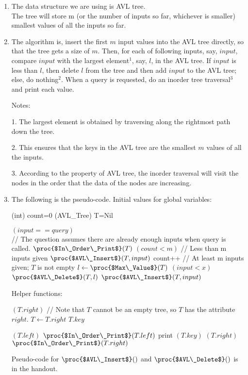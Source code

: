 \documentclass[11pt, answers]{exam}
\theoremstyle{plain}
\theoremstyle{definition}
\begin{document}
\begin{questions}
\question
\begin{solution}
\begin{enumerate}
\item The data structure we are using is AVL tree. \\
The tree will store m (or the number of inputs so far, whichever is smaller) smallest values of all the inputs so far.

\item The algorithm is, insert the first $m$ input values into the AVL tree directly, so that the tree gets a size of $m$. Then, for each of following inputs, say, $input$, compare $input$ with the largest element$^1$, say, $l$, in the AVL tree. If $input$ is less than $l$, then delete $l$ from the tree and then add $input$ to the AVL tree; else, do nothing$^2$. When a query is requested, do an inorder tree traversal$^3$ and print each value.

Notes: 

1. The largest element is obtained by traversing along the rightmost path down the tree.

2. This ensures that the keys in the AVL tree are the smallest $m$ values of all the inputs. 

3.  According to the property of AVL tree, the inorder traversal will visit the nodes in the order that the data of the nodes are increasing.

\item The following is the pseudo-code.
Initial values for global variables:
\begin{codebox}
\li (int) count=0
\li (AVL\_Tree) T=Nil
\end{codebox}

\begin{codebox}
\li \If $(input == query)$ \\// The question assumes there are already enough inputs when query is called.
\li     \Then $\proc{$In\_Order\_Print$}(T)$
\li     \Else
\li     \If $(count < m)$ // Less than m inputs given
\li         \Then $\proc{$AVL\_Insert$}(T, input)$
\li         count++
\li     \Else // At least m inputs given; $T$ is not empty
\li         $l \gets \proc{$Max\_Value$}(T)$
\li         \If $(input<x)$
\li             \Then $\proc{$AVL\_Delete$}(T, l)$
\li             $\proc{$AVL\_Insert$}(T, input)$
\end{codebox}
Helper functions:
\begin{codebox}
\li \While $(T.right)$ // Note that $T$ cannot be an empty tree, so $T$ has the attribute $right$.
\li     \Do $T \gets T.right$ \End
\li \Return $T.key$
\end{codebox}
\begin{codebox}
\li \If $(T.left)$
\li     \Then $\proc{$In\_Order\_Print$}(T.left)$ \End
\li print $(T.key)$
\li \If $(T.right)$
\li     \Then $\proc{$In\_Order\_Print$}(T.right)$ \End
\end{codebox}
Pseudo-code for $\proc{$AVL\_Insert$}()$ and $\proc{$AVL\_Delete$}()$ is in the handout.


\end{enumerate}
\end{solution}
\end{questions}
\end{document}
